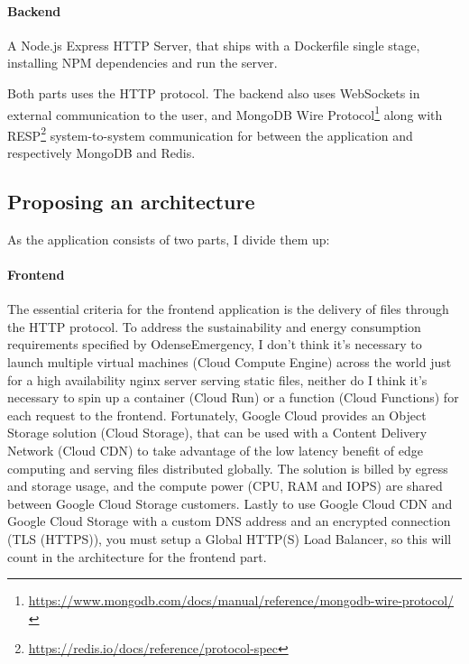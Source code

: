 \documentclass[11pt]{article}
\begin{document}
\paragraph{Backend}
A Node.js Express HTTP Server, that ships with a Dockerfile single stage, installing NPM dependencies and run the server.

\vspace{.25cm}

Both parts uses the HTTP protocol. The backend also uses WebSockets in external communication to the user, and MongoDB Wire Protocol\footnote{\href{https://www.mongodb.com/docs/manual/reference/mongodb-wire-protocol/}{https://www.mongodb.com/docs/manual/reference/mongodb-wire-protocol/}} along with RESP\footnote{\href{https://redis.io/docs/reference/protocol-spec}{https://redis.io/docs/reference/protocol-spec}} system-to-system communication for between the application and respectively MongoDB and Redis.

\subsection{Proposing an architecture}
As the application consists of two parts, I divide them up:

\paragraph{Frontend}
The essential criteria for the frontend application is the delivery of files through the HTTP protocol. To address the sustainability and energy consumption requirements specified by OdenseEmergency, I don't think it's necessary to launch multiple virtual machines (Cloud Compute Engine) across the world just for a high availability nginx server serving static files, neither do I think it's necessary to spin up a container (Cloud Run) or a function (Cloud Functions) for each request to the frontend. Fortunately, Google Cloud provides an Object Storage solution (Cloud Storage), that can be used with a Content Delivery Network (Cloud CDN) to take advantage of the low latency benefit of edge computing and serving files distributed globally. The solution is billed by egress and storage usage, and the compute power (CPU, RAM and IOPS) are shared between Google Cloud Storage customers. Lastly to use Google Cloud CDN and Google Cloud Storage with a custom DNS address and an encrypted connection (TLS (HTTPS)), you must setup a Global HTTP(S) Load Balancer, so this will count in the architecture for the frontend part.
\end{document}
